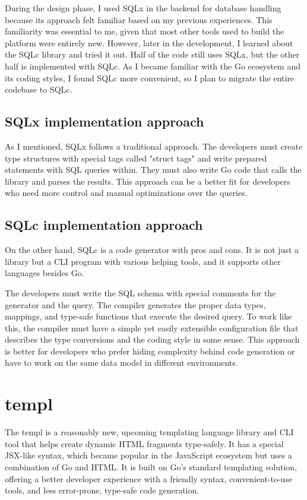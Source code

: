 During the design phase, I used SQLx in the backend for database handling because its approach felt familiar based on my previous experiences. This familiarity was essential to me, given that most other tools used to build the platform were entirely new. However, later in the development, I learned about the SQLc library and tried it out. Half of the code still uses SQLx, but the other half is implemented with SQLc. As I became familiar with the Go ecosystem and its coding styles, I found SQLc more convenient, so I plan to migrate the entire codebase to SQLc.

\subsection{SQLx implementation approach}
As I mentioned, SQLx follows a traditional approach. The developers must create type structures with special tags called "struct tags" and write prepared statements with SQL queries within. They must also write Go code that calls the library and parses the results. This approach can be a better fit for developers who need more control and manual optimizations over the queries.

\subsection{SQLc implementation approach}
On the other hand, SQLc is a code generator with pros and cons. It is not just a library but a CLI program with various helping tools, and it supports other languages besides Go. 

The developers must write the SQL schema with special comments for the generator and the query. The compiler generates the proper data types, mappings, and type-safe functions that execute the desired query. To work like this, the compiler must have a simple yet easily extensible configuration file that describes the type conversions and the coding style in some sense. This approach is better for developers who prefer hiding complexity behind code generation or have to work on the same data model in different environments.

\section{templ}

The templ is a reasonably new, upcoming templating language library and CLI tool that helps create dynamic HTML fragments type-safely. It has a special JSX-like syntax, which became popular in the JavaScript ecosystem but uses a combination of Go and HTML. It is built on Go's standard templating solution, offering a better developer experience with a friendly syntax, convenient-to-use tools, and less error-prone, type-safe code generation.

